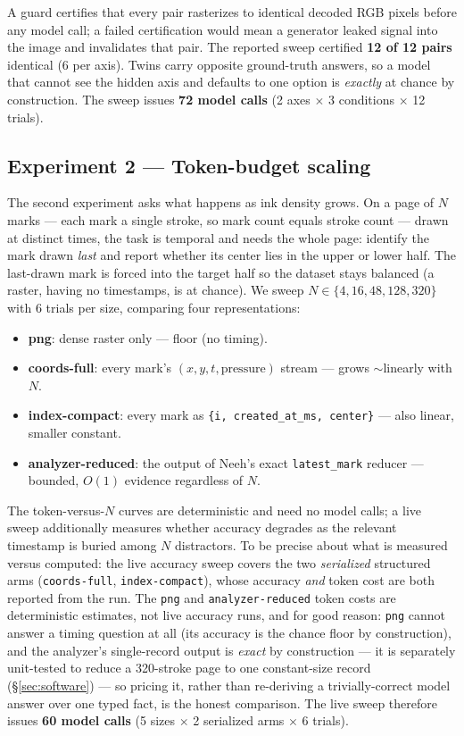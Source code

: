 \documentclass[11pt]{article}
\newcommand{\code}[1]{\texttt{#1}}
\begin{document}
A guard certifies that every pair rasterizes to identical decoded RGB pixels
before any model call; a failed certification would mean a generator leaked
signal into the image and invalidates that pair. The reported sweep certified
\textbf{12 of 12 pairs} identical (6 per axis). Twins carry opposite ground-truth
answers, so a model that cannot see the hidden axis and defaults to one option is
\emph{exactly} at chance by construction. The sweep issues
\textbf{72 model calls} (2 axes $\times$ 3 conditions $\times$ 12 trials).

\subsection{Experiment 2 --- Token-budget scaling}
\label{sec:m1bmethod}
The second experiment asks what happens as ink density grows. On a page of $N$
marks --- each mark a single stroke, so mark count equals stroke count --- drawn
at distinct times, the task is temporal and needs the whole
page: identify the mark drawn \emph{last} and report whether its center lies in
the upper or lower half. The last-drawn mark is forced into the target half so
the dataset stays balanced (a raster, having no timestamps, is at chance). We
sweep $N \in \{4, 16, 48, 128, 320\}$ with 6 trials per size, comparing four
representations:
\begin{itemize}[leftmargin=1.4em, itemsep=1pt]
\item \textbf{png}: dense raster only --- floor (no timing).
\item \textbf{coords-full}: every mark's $(x,y,t,\text{pressure})$ stream --- grows
  $\sim$linearly with $N$.
\item \textbf{index-compact}: every mark as \code{\{i, created\_at\_ms, center\}}
  --- also linear, smaller constant.
\item \textbf{analyzer-reduced}: the output of Neeh's exact \code{latest\_mark}
  reducer --- bounded, $O(1)$ evidence regardless of $N$.
\end{itemize}
The token-versus-$N$ curves are deterministic and need no model calls; a live
sweep additionally measures whether accuracy degrades as the relevant timestamp
is buried among $N$ distractors. To be precise about what is measured versus
computed: the live accuracy sweep covers the two \emph{serialized} structured
arms (\code{coords-full}, \code{index-compact}), whose accuracy \emph{and} token
cost are both reported from the run. The \code{png} and \code{analyzer-reduced}
token costs are deterministic estimates, not live accuracy runs, and for good
reason: \code{png} cannot answer a timing question at all (its accuracy is the
chance floor by construction), and the analyzer's single-record output is
\emph{exact} by construction --- it is separately unit-tested to reduce a
320-stroke page to one constant-size record (\S\ref{sec:software}) --- so pricing
it, rather than re-deriving a trivially-correct model answer over one typed fact,
is the honest comparison. The live sweep therefore issues \textbf{60 model calls}
(5 sizes $\times$ 2 serialized arms $\times$ 6 trials).
\end{document}
